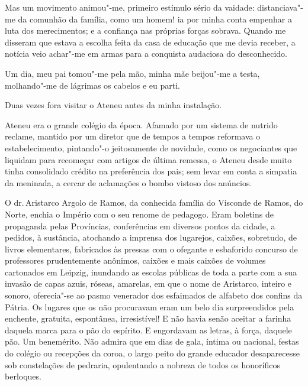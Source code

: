 Mas um movimento animou"-me, primeiro estímulo sério da vaidade: 
distanciava"-me da comunhão da família, como um homem! ia por minha conta 
empenhar a luta dos merecimentos; e a confiança nas próprias forças sobrava. 
Quando me disseram que estava a escolha feita da casa de educação que me devia
receber, a notícia veio achar"-me em armas para a conquista audaciosa
do desconhecido. 

Um dia, meu pai tomou"-me pela mão, minha mãe
beijou"-me a testa, molhando"-me de lágrimas os cabelos e eu parti.

Duas vezes fora visitar o Ateneu antes da minha instalação. 

Ateneu era o grande colégio da época. Afamado por um sistema de nutrido reclame,
mantido por um diretor que de tempos a tempos reformava o
estabelecimento, pintando"-o jeitosamente de novidade, como os
negociantes que liquidam para recomeçar com artigos de última remessa,
o Ateneu desde muito tinha consolidado crédito na preferência dos pais;
sem levar em conta a simpatia da meninada, a cercar de aclamações o
bombo vistoso dos anúncios. 

O dr.\,Aristarco Argolo de Ramos, da
conhecida família do Visconde de Ramos, do Norte, enchia o Império com
o seu renome de pedagogo. Eram boletins de propaganda pelas Províncias,
conferências em diversos pontos da cidade, a pedidos, à sustância,
atochando a imprensa dos lugarejos, caixões, sobretudo, de livros
elementares, fabricados às pressas com o ofegante e esbaforido concurso
de professores prudentemente anônimos, caixões e mais caixões de
volumes cartonados em Leipzig, inundando as escolas públicas de toda a
parte com a sua invasão de capas azuis, róseas, amarelas, em que o nome
de Aristarco, inteiro e sonoro, oferecia"-se ao pasmo venerador dos
esfaimados de alfabeto dos confins da Pátria. Os lugares que os não
procuravam eram um belo dia surpreendidos pela enchente, gratuita,
espontânea, irresistível! E não havia senão aceitar a farinha daquela
marca para o pão do espírito. E engordavam as letras, à força, daquele
pão. Um benemérito. Não admira que em dias de gala, íntima ou nacional,
festas do colégio ou recepções da coroa, o largo peito do grande
educador desaparecesse sob constelações de pedraria, opulentando a
nobreza de todos os honoríficos berloques. 

